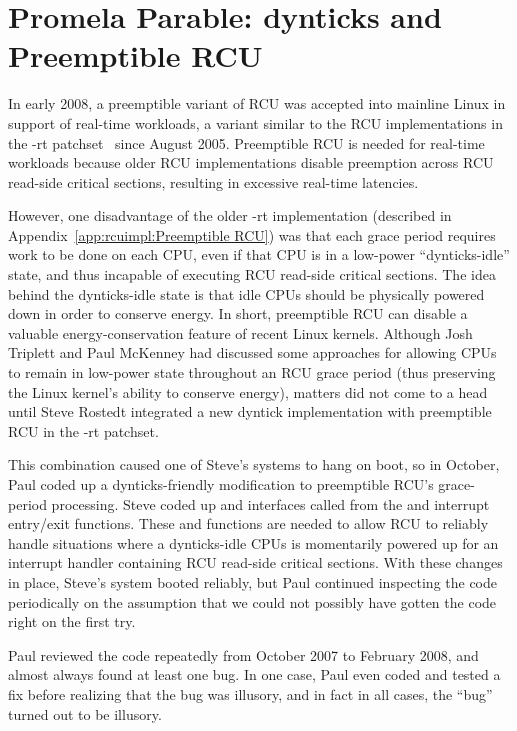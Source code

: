 
\section{Promela Parable: dynticks and Preemptible RCU}
\label{app:formal:Promela Parable: dynticks and Preemptible RCU}

In early 2008, a preemptible variant of RCU was accepted into
mainline Linux in support of real-time workloads,
a variant similar to the RCU implementations in
the -rt patchset~\cite{IngoMolnar05a}
since August 2005.
Preemptible RCU is needed for real-time workloads because older
RCU implementations disable preemption across RCU read-side
critical sections, resulting in excessive real-time latencies.

However, one disadvantage of the older -rt implementation
(described in Appendix~\ref{app:rcuimpl:Preemptible RCU})
was that each grace period
requires work to be done on each CPU, even if that CPU is in a low-power
``dynticks-idle'' state,
and thus incapable of executing RCU read-side critical sections.
The idea behind the dynticks-idle state is that idle CPUs
should be physically powered down in order to conserve energy.
In short, preemptible RCU can disable a valuable energy-conservation
feature of recent Linux kernels.
Although Josh Triplett and Paul McKenney
had discussed some approaches for allowing
CPUs to remain in low-power state throughout an RCU grace period
(thus preserving the Linux kernel's ability to conserve energy), matters
did not come to a head until Steve Rostedt integrated a new dyntick
implementation with preemptible RCU in the -rt patchset.

This combination caused one of Steve's systems to hang on boot, so in
October, Paul coded up a dynticks-friendly modification to preemptible RCU's
grace-period processing.
Steve coded up  and 
interfaces called from the
 and  interrupt
entry/exit functions.
These  and 
functions are needed to allow RCU to reliably handle situations where
a dynticks-idle CPUs is momentarily powered up for an interrupt
handler containing RCU read-side critical sections.
With these changes in place, Steve's system booted reliably,
but Paul continued inspecting the code periodically on the assumption
that we could not possibly have gotten the code right on the first try.

Paul reviewed the code repeatedly from October 2007 to February 2008,
and almost always found at least one bug.
In one case, Paul even coded and tested a fix before realizing that the
bug was illusory, and in fact in all cases, the ``bug'' turned out to be
illusory.

